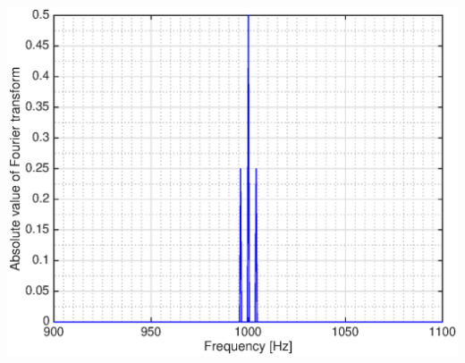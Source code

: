 \documentclass{beamer}
\begin{document}
\begin{frame}
\begin{columns}
\begin{column}{0.175\textwidth}
      \includegraphics[height=0.25\textheight]{am_frequency}
    \end{column}
  \end{columns}

  \pause{}

  \vspace{2mm}


\end{frame}
\end{document}
